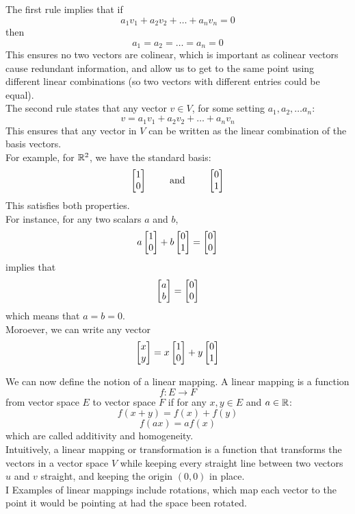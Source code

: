 \documentclass[12pt]{article}
\begin{document}
    The first rule implies that if
    \[ a_1v_1 + a_2v_2 + \dots + a_nv_n = 0 \]
    then 
    \[a_1 = a_2 = \dots = a_n = 0\]
    This ensures no two vectors are colinear,
    which is important as colinear vectors
    cause redundant information,
    and allow us to get to the same point
    using different linear combinations
    (so two vectors with different entries could
    be equal). \\

    The second rule states that any vector $v \in V$,
    for some setting $a_1, a_2, \dots a_n$:
    \[ v = a_1v_1 + a_2v_2 + \dots + a_nv_n \]
    This ensures that any vector in $V$
    can be written as the linear combination
    of the basis vectors. \\

    For example, for $\mathbb{R}^2$,
    we have the standard basis:
    \[ \begin{bmatrix} 1 \\ 0 \end{bmatrix} \qquad
    \text{ and } \qquad \begin{bmatrix} 0 \\ 1 \end{bmatrix} \]
    This satisfies both properties. \\
    For instance, for any two scalars $a$ and $b$,
    \[ a\begin{bmatrix} 1 \\ 0 \end{bmatrix} + b\begin{bmatrix} 0 \\ 1 \end{bmatrix} = \begin{bmatrix} 0 \\ 0 \end{bmatrix} \]
    implies that 
    \[ \begin{bmatrix} a \\ b \end{bmatrix} = \begin{bmatrix} 0 \\ 0 \end{bmatrix}  \]
    which means that $a = b = 0$. \\
    Moroever, we can write any vector
    \[ \begin{bmatrix} x \\ y \end{bmatrix} = x\begin{bmatrix} 1 \\ 0 \end{bmatrix} + y \begin{bmatrix} 0 \\ 1 \end{bmatrix} \]

    We can now define the notion of a linear
    mapping.
    A linear mapping is a function
    \[ f: E \to F \]
    from vector space $E$ to vector space $F$
    if for any $x, y \in E$ and $a \in \mathbb{R}$:
    \[ f(x+y) = f(x) + f(y) \]
    \[ f(ax) = af(x) \]
    which are called additivity and homogeneity. \\
    Intuitively, a linear mapping or transformation
    is a function that transforms the vectors
    in a vector space $V$ while keeping
    every straight line between two vectors $u$ and $v$
    straight, and keeping the origin $(0, 0)$
    in place. \\
    I
    Examples of linear mappings include rotations,
    which map each vector to the point it would 
    be pointing at had the space been rotated. \\
\end{document}
